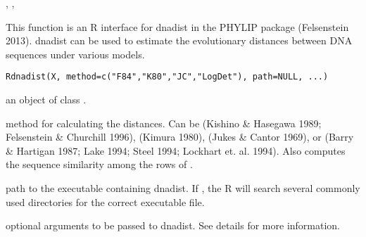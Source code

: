 \documentclass[a4paper]{book}
\begin{document}
%
\begin{SeeAlso}\relax
{}, , 
\end{SeeAlso}
%
\begin{Description}\relax
This function is an R interface for dnadist in the PHYLIP package (Felsenstein 2013). dnadist can be used to estimate the evolutionary distances between DNA sequences under various models.
\end{Description}
%
\begin{Usage}
\begin{verbatim}
Rdnadist(X, method=c("F84","K80","JC","LogDet"), path=NULL, ...)
\end{verbatim}
\end{Usage}
%
\begin{Arguments}
\begin{ldescription}
\item[\code{X}] an object of class .
\item[\code{method}] method for calculating the distances. Can be  (Kishino \& Hasegawa 1989; Felsenstein \& Churchill 1996),  (Kimura 1980),  (Jukes \& Cantor 1969), or  (Barry \& Hartigan 1987; Lake 1994; Steel 1994; Lockhart et. al. 1994). Also  computes the sequence similarity among the rows of .
\item[\code{path}] path to the executable containing dnadist. If , the R will search several commonly used directories for the correct executable file.
\item[\code{...}] optional arguments to be passed to dnadist. See details for more information.
\end{ldescription}
\end{Arguments}
%
\end{document}
